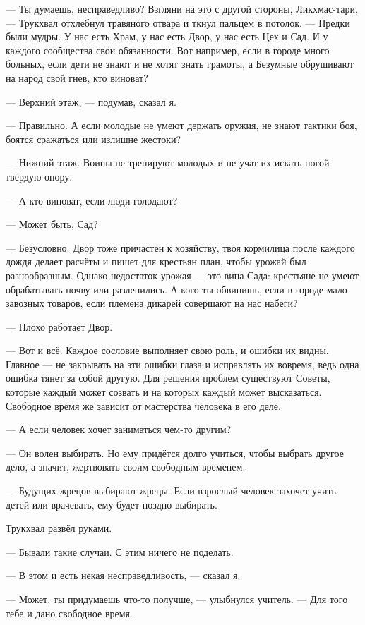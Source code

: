 --- Ты думаешь, несправедливо?
Взгляни на это с другой стороны, Ликхмас-тари, --- Трукхвал отхлебнул травяного отвара и ткнул пальцем в потолок.
--- Предки были мудры.
У нас есть Храм, у нас есть Двор, у нас есть Цех и Сад.
И у каждого сообщества свои обязанности.
Вот например, если в городе много больных, если дети не знают и не хотят знать грамоты, а Безумные обрушивают на народ свой гнев, кто виноват?

--- Верхний этаж, --- подумав, сказал я.

--- Правильно.
А если молодые не умеют держать оружия, не знают тактики боя, боятся сражаться или излишне жестоки?

--- Нижний этаж.
Воины не тренируют молодых и не учат их искать ногой твёрдую опору.

--- А кто виноват, если люди голодают?

--- Может быть, Сад?

--- Безусловно.
Двор тоже причастен к хозяйству, твоя кормилица после каждого дождя делает расчёты и пишет для крестьян план, чтобы урожай был разнообразным.
Однако недостаток урожая --- это вина Сада: крестьяне не умеют обрабатывать почву или разленились.
А кого ты обвинишь, если в городе мало завозных товаров, если племена дикарей совершают на нас набеги?

--- Плохо работает Двор.

--- Вот и всё.
Каждое сословие выполняет свою роль, и ошибки их видны.
Главное --- не закрывать на эти ошибки глаза и исправлять их вовремя, ведь одна ошибка тянет за собой другую.
Для решения проблем существуют Советы, которые каждый может созвать и на которых каждый может высказаться.
Свободное время же зависит от мастерства человека в его деле.

--- А если человек хочет заниматься чем-то другим?

--- Он волен выбирать.
Но ему придётся долго учиться, чтобы выбрать другое дело, а значит, жертвовать своим свободным временем.

--- Будущих жрецов выбирают жрецы.
Если взрослый человек захочет учить детей или врачевать, ему будет поздно выбирать.

Трукхвал развёл руками.

--- Бывали такие случаи.
С этим ничего не поделать.

--- В этом и есть некая несправедливость, --- сказал я.

--- Может, ты придумаешь что-то получше, --- улыбнулся учитель.
--- Для того тебе и дано свободное время.

